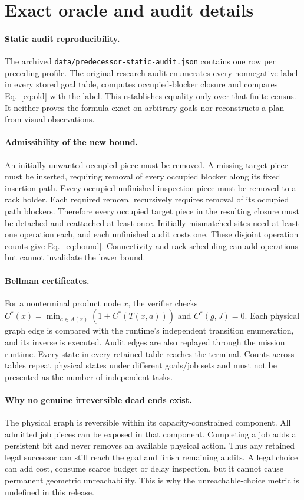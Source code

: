 \section{Exact oracle and audit details}
\paragraph{Static audit reproducibility.}
The archived \texttt{data/predecessor-static-audit.json} contains one row
per preceding profile. The original research audit enumerates every
nonnegative label in every stored goal table, computes occupied-blocker
closure and compares Eq.~\ref{eq:old} with the label. This establishes
equality only over that finite census. It neither proves the formula exact
on arbitrary goals nor reconstructs a plan from visual observations.

\paragraph{Admissibility of the new bound.}
An initially unwanted occupied piece must be removed. A missing target
piece must be inserted, requiring removal of every occupied blocker along
its fixed insertion path. Every occupied unfinished inspection piece must
be removed to a rack holder. Each required removal recursively requires
removal of its occupied path blockers. Therefore every occupied target
piece in the resulting closure must be detached and reattached at least
once. Initially mismatched sites need at least one operation each, and
each unfinished audit costs one. These disjoint operation counts give
Eq.~\ref{eq:bound}. Connectivity and rack scheduling can add operations
but cannot invalidate the lower bound.

\paragraph{Bellman certificates.}
For a nonterminal product node $x$, the verifier checks
$C^*(x)=\min_{a\in A(x)}(1+C^*(T(x,a)))$ and $C^*(g,J)=0$.
Each physical graph edge is compared with the runtime's independent
transition enumeration, and its inverse is executed. Audit edges are
also replayed through the mission runtime. Every state in every retained
table reaches the terminal. Counts across tables repeat physical
states under different goals/job sets and must not be presented as the
number of independent tasks.

\paragraph{Why no genuine irreversible dead ends exist.}
The physical graph is reversible within its capacity-constrained component.
All admitted job pieces can be exposed in that component. Completing a job
adds a persistent bit and never removes an available physical action.
Thus any retained legal successor can still reach the goal and finish
remaining audits. A legal choice can add cost, consume scarce budget or
delay inspection, but it cannot cause permanent geometric unreachability.
This is why the unreachable-choice metric is undefined in this release.

